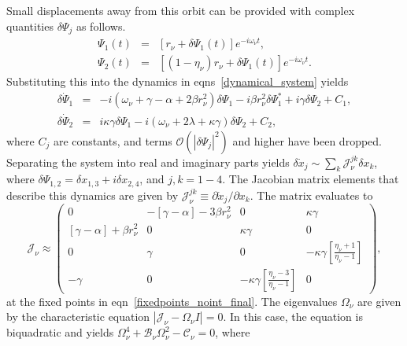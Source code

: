 \documentclass[a4paper,10pt]{article}
\begin{document}
Small displacements away from this orbit can be provided with complex quantities $\delta\Psi_j$ as follows. 
\begin{eqnarray}
 \Psi_1(t) &=& \left[r_\nu + \delta\Psi_1(t)\right]e^{-i\omega_\nu t},\nonumber \\
 \Psi_2(t) &=& \left[\left(1-\eta_\nu\right)r_\nu + \delta\Psi_1(t)\right]e^{-i\omega_\nu t}.
\end{eqnarray}
Substituting this into the dynamics in eqns~\ref{dynamical_system} yields
\begin{eqnarray}
 \delta\dot{\Psi}_1 &=& -i\left(\omega_\nu+\gamma-\alpha+2\beta r^2_\nu\right)\delta\Psi_1-i\beta r^2_\nu \delta\Psi^\ast_1+i\gamma\delta\Psi_2 + C_1,\nonumber \\
\delta\dot{\Psi}_2 &=& i\kappa\gamma\delta\Psi_1 -i\left(\omega_\nu+2\lambda+\kappa\gamma\right)\delta\Psi_2 + C_2,
\end{eqnarray}
where $C_j$ are constants, and terms $\mathcal{O}(|\delta\Psi_j|^2)$ and higher have been dropped. Separating the system into real and imaginary parts yields $\delta \dot{x}_j \sim \sum_k \mathcal{J}^{jk}_\nu\delta x_k$, where $\delta\Psi_{1,2}=\delta x_{1,3} + i \delta x_{2,4}$, and ${j,k}=1-4$. The Jacobian matrix elements that describe this dynamics are given by $\mathcal{J}^{jk}_\nu\equiv\partial\dot{x}_j/\partial x_k$. The matrix evaluates to
\begin{equation}
\label{jacobian:nobosonint}
\mathcal{J}_\nu \approx \begin{pmatrix}
 0 & -[\gamma -\alpha]-3 \beta r^2_\nu  & 0 & \kappa \gamma  \\
 [\gamma -\alpha ]+\beta r^2_\nu  & 0 & \kappa \gamma  & 0 \\
 0 & \gamma  & 0 & -\kappa\gamma \left[\frac{\eta_\nu+1}{\eta_\nu-1}\right] \\
 -\gamma  & 0 & -\kappa\gamma\left[\frac{\eta_\nu-3}{\eta_\nu-1}\right] & 0
\end{pmatrix},
\end{equation}
at the fixed points in eqn~\ref{fixedpoints_noint_final}. The eigenvalues $\Omega_\nu$ are given by the characteristic equation $|\mathcal{J}_\nu-\Omega_\nu I|=0$. In this case, the equation is biquadratic and yields $\Omega_\nu^4 + \mathcal{B}_\nu\Omega_\nu^2-\mathcal{C}_\nu =0$, where
\end{document}
